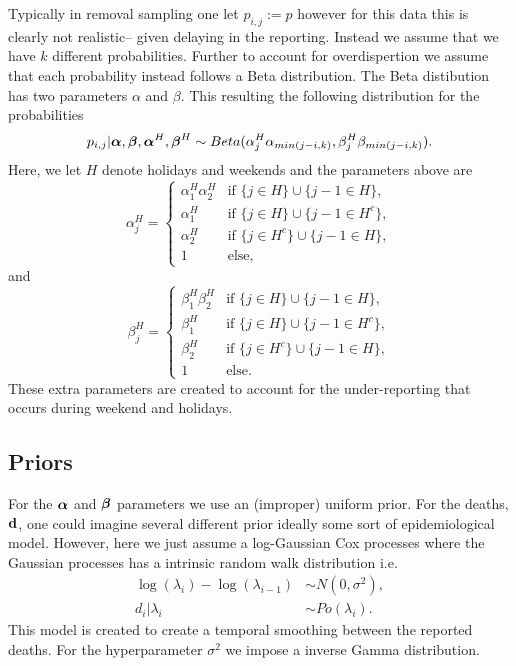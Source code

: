 Typically in removal sampling one let $p_{i,j}:=p$ however for this data this is clearly not realistic-- given delaying in the reporting. Instead we assume that we have $k$ different probabilities. Further to account for overdispertion we assume that each probability instead follows a Beta distribution. The Beta distibution has two parameters $\alpha$ and $\beta$. This resulting the following distribution for the probabilities
$$
p_{i,j}| {\boldsymbol{\mathrm{\alpha}}},{\boldsymbol{\mathrm{\beta}}}, {\boldsymbol{\mathrm{\alpha}}}^H,{\boldsymbol{\mathrm{\beta}}}^H  \sim Beta(\alpha^H_j\alpha_{min(j-i,k)},\beta^H_j\beta_{min(j-i,k)}).
$$
Here, we let $H$ denote holidays and weekends and the parameters above are
$$
\alpha^H_j = \begin{cases}
\alpha_1^H \alpha_2^H & \mbox{if }  \{j\in H \}\cup  \{j-1\in H \},  \\
\alpha_1^H & \mbox{if }  \{j\in H \}\cup  \{j-1\in H^c \}, \\
\alpha_2^H & \mbox{if }  \{j\in H^c \}\cup  \{j-1\in H \}, \\
1 & \mbox{else,}
\end{cases}
$$
and
$$
\beta^H_j = \begin{cases}
\beta_1^H \beta_2^H & \mbox{if }  \{j\in H \}\cup  \{j-1\in H \},  \\
\beta_1^H & \mbox{if }  \{j\in H \}\cup  \{j-1\in H^c \}, \\
\beta_2^H & \mbox{if }  \{j\in H^c \}\cup  \{j-1\in H \}, \\
1 & \mbox{else.}
\end{cases}
$$
These extra parameters are created to account for the under-reporting that occurs during weekend and holidays.


\subsection{Priors}
For the ${\boldsymbol{\mathrm{\alpha}}}$ and ${\boldsymbol{\mathrm{\beta}}}$ parameters we use an (improper) uniform prior. For the deaths, ${\boldsymbol{\mathrm{d}}}$, one could imagine several different prior ideally some sort of epidemiological model. However, here we just assume a log-Gaussian Cox processes \cite{Moller1998_log_gaussian} where the Gaussian processes has a intrinsic random walk distribution \cite{Rue2005_gaussian_markov} i.e.
\begin{align*}
\log(\lambda_i) - \log(\lambda_{i-1}) &\sim N(0,\sigma^2),\\
d_i| \lambda_i  &\sim Po(\lambda_i).
\end{align*}
This model is created to create a temporal smoothing between the reported deaths.
For the hyperparameter $\sigma^2$ we impose a inverse Gamma distribution.

